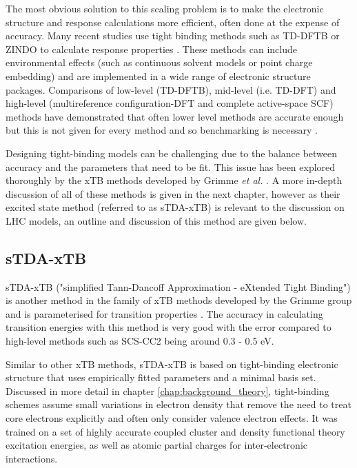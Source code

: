 The most obvious solution to this scaling problem is to make the electronic structure 
and response calculations more efficient, often done at the expense of accuracy.
Many recent studies use tight binding methods such as TD-DFTB or ZINDO to calculate
response properties \cite{Jurinovich2015, Olbrich2010, Curutchet2011, Curutchet2012}. 
These methods can include environmental effects (such as continuous solvent models 
or point charge embedding) and are implemented in a wide range of electronic structure
packages. Comparisons of low-level (TD-DFTB), mid-level (i.e. TD-DFT) and high-level
(multireference configuration-DFT and complete active-space SCF) methods have demonstrated
that often lower level methods are accurate enough but this is not given for every
method and so benchmarking is necessary \cite{Andreussi2015, Hansen2019, Poddubnyy2021}.

Designing tight-binding models can be challenging due to the balance between accuracy
and the parameters that need to be fit. This issue has been explored thoroughly 
by the xTB methods developed by Grimme \emph{et al.} \cite{Bannwarth2020}. A more
in-depth discussion of all of these methods is given in the next chapter, however
as their excited state method (referred to as sTDA-xTB) is relevant to the discussion
on LHC models, an outline and discussion of this method are given below.

\subsection{sTDA-xTB}
\label{subsec:stda_xtb}
sTDA-xTB ("simplified Tann-Dancoff Approximation - eXtended Tight Binding") is another
method in the family of xTB methods developed by the Grimme group and is parameterised
for transition properties \cite{Grimme2016}. The accuracy in calculating transition
energies with this method is very good with the error compared to high-level methods
such as SCS-CC2 being around 0.3 - 0.5 eV.

Similar to other xTB methods, sTDA-xTB is based on tight-binding electronic structure
that uses empirically fitted parameters and a minimal basis set. Discussed in more
detail in chapter \ref{chap:background_theory}, tight-binding schemes assume small
variations in electron density that remove the need to treat core electrons explicitly
and often only consider valence electron effects. It was trained on a set of highly
accurate coupled cluster and density functional theory excitation energies, as well
as atomic partial charges for inter-electronic interactions.

